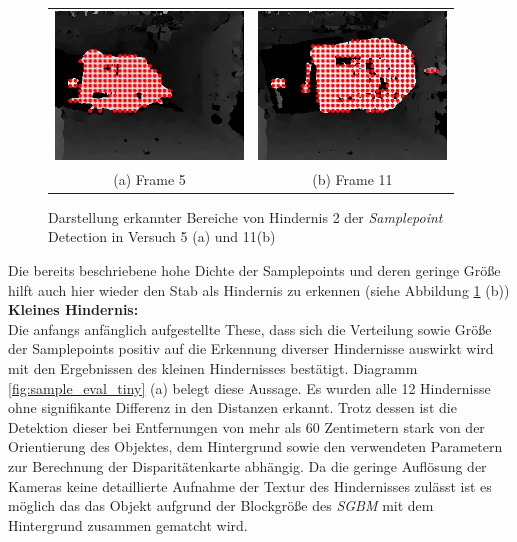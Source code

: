 \begin{figure}[h]
	\centering
	\begin{tabular}{cc}
	\includegraphics[width=5cm]{img/evaluation/sample_tiny_test_5_disparity}&
	\includegraphics[width=5cm]{img/evaluation/sample_tiny_test_11_disparity}\\
	(a) Frame 5 &  (b) Frame 11
	\end{tabular}
	\caption{Darstellung erkannter Bereiche von Hindernis 2 der \emph{Samplepoint} Detection in Versuch 5 (a) und 11(b) }
	\label{fig:sample_eval_medium_fails}
\end{figure}

\noindent
Die bereits beschriebene hohe Dichte der Samplepoints und deren geringe Größe hilft auch hier wieder den Stab als Hindernis zu erkennen (siehe Abbildung \ref{fig:sample_eval_medium_fails} (b))\\


\noindent
\textbf{Kleines Hindernis:}\\
Die anfangs anfänglich aufgestellte These, dass sich die Verteilung sowie Größe der Samplepoints positiv auf die Erkennung diverser Hindernisse auswirkt wird mit den Ergebnissen des kleinen Hindernisses bestätigt. Diagramm \ref{fig:sample_eval_tiny} (a) belegt diese Aussage. Es wurden alle 12 Hindernisse ohne signifikante Differenz in den Distanzen erkannt. Trotz dessen ist die Detektion dieser bei Entfernungen von mehr als 60 Zentimetern stark von der Orientierung des Objektes, dem Hintergrund sowie den verwendeten Parametern zur Berechnung der Disparitätenkarte abhängig. Da die geringe Auflösung der Kameras keine detaillierte Aufnahme der Textur des Hindernisses zulässt ist es möglich das das Objekt aufgrund der Blockgröße des \emph{SGBM} mit dem Hintergrund zusammen gematcht wird. 

